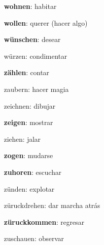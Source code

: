 \begin{multicols}{2}
\begin{myitemize}
\item \textbf{wohnen}: habitar
\item \textbf{wollen}: querer (hacer algo)
\item \textbf{wünschen}: desear
\item würzen: condimentar
\item \textbf{zählen}: contar
\item zaubern: hacer magia
\item zeichnen: dibujar
\item \textbf{zeigen}: mostrar
\item ziehen: jalar
\item \textbf{zogen}: mudarse
\item \textbf{zuhoren}: escuchar
\item zünden: explotar
\item züruckdrehen: dar marcha atrás
\item \textbf{züruckkommen}: regresar
\item zuschauen: observar
\end{myitemize}
\end{multicols}
